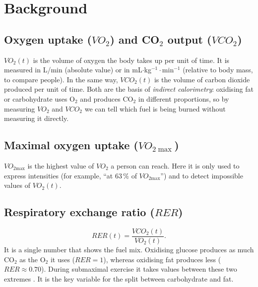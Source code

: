 \documentclass[10pt,a4paper]{article}
\newcommand{\smax}{{\scriptscriptstyle\text{max}}}
\newcommand{\VO}{\ensuremath{\mathit{VO}_2}}               %
\newcommand{\VCO}{\ensuremath{\mathit{VCO}_2}}
\newcommand{\VOmax}{\ensuremath{\mathit{VO}_{2\smax}}}
\newcommand{\RER}{\ensuremath{\mathit{RER}}}
\begin{document}
\section{Background}\label{sec:conceptes}

\subsection{Oxygen uptake (\texorpdfstring{$\mathit{VO}_2$}{VO2}) and CO\texorpdfstring{$_2$}{2}
output (\texorpdfstring{$\mathit{VCO}_2$}{VCO2})}\label{sec:gasos}
$\VO(t)$ is the volume of oxygen the body takes up per unit of time. It is measured in
L/min (absolute value) or in mL$\cdot$kg$^{-1}\cdot$min$^{-1}$ (relative to body mass, to
compare people). In the same way, $\VCO(t)$ is the volume of carbon dioxide produced per
unit of time. Both are the basis of \emph{indirect calorimetry}: oxidising fat or
carbohydrate uses O$_2$ and produces CO$_2$ in different proportions, so by measuring $\VO$
and $\VCO$ we can tell which fuel is being burned without measuring it directly.

\subsection{Maximal oxygen uptake (\texorpdfstring{$\mathit{VO}_{2\max}$}{VO2max})}
$\VOmax$ is the highest value of $\VO$ a person can reach. Here it is only used to express
intensities (for example, ``at 63\,\% of $\VOmax$'') and to detect impossible values of
$\VO(t)$.

\subsection{Respiratory exchange ratio (\texorpdfstring{$\mathit{RER}$}{RER})}
\begin{equation}
  \RER(t)=\frac{\VCO(t)}{\VO(t)} .
  \label{eq:rer-def}
\end{equation}
It is a single number that shows the fuel mix. Oxidising glucose produces as much CO$_2$ as
the O$_2$ it uses ($\RER=1$), whereas oxidising fat produces less ($\RER\approx0.70$).
During submaximal exercise it takes values between these two extremes \citep{peronnet1991}.
It is the key variable for the split between carbohydrate and fat.
\end{document}
